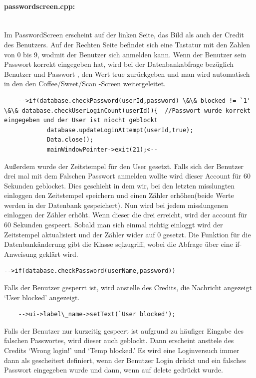 \documentclass[11pt,a4paper]{article} %
\begin{document}
\paragraph{passwordscreen.cpp:} $\;$ \\
	Im PasswordScreen erscheint auf der linken Seite, das Bild als auch der Credit des Benutzers. Auf der Rechten Seite befindet sich eine Tastatur mit den Zahlen von 0 bis 9, wodmit der Benutzer sich anmelden kann.
	Wenn der Benutzer sein Passwort korrekt eingegeben hat, wird bei der Datenbankabfrage bezüglich Benutzer und Passwort , den Wert true zurückgeben und man wird automatisch in den den Coffee/Sweet/Scan -Screen weitergeleitet.
	\begin{frame}

\begin{lstlisting}
	-->if(database.checkPassword(userId,password) \&\& blocked != `1' \&\& database.checkUserLoginCount(userId)){  //Passwort wurde korrekt eingegeben und der User ist niocht geblockt
            database.updateLoginAttempt(userId,true);
            Data.close();
            mainWindowPointer->exit(21);<--
            \end{lstlisting}
\end{frame}
\par			
	Außerdem wurde der Zeitstempel für den User gesetzt. 
	Falls sich der Benutzer drei mal mit dem Falschen Passwort anmelden wollte wird dieser Account für 60 Sekunden geblocket.
	Dies geschieht in dem wir, bei den letzten misslungten einloggen den Zeitstempel speichern und einen Zähler erhöhen(beide Werte werden in der Datenbank gespeichert).
	Nun wird bei jedem misslungenen einloggen der Zähler erhöht. Wenn dieser die drei erreicht, wird der account für 60 Sekunden gespeert.
	Sobald man sich einmal richtig einloggt wird der Zeitstempel aktualisiert und der Zähler wider auf 0 gesetzt. Die Funktion für die Datenbankänderung gibt die Klasse sqlzugriff, wobei die Abfrage über eine if-Anweisung geklärt wird.
	
	\begin{frame}

\begin{lstlisting}
-->if(database.checkPassword(userName,password))
\end{lstlisting}
\end{frame}
\par	
	Falls der Benutzer gesperrt ist, wird anstelle des Credits, die Nachricht angezeigt `User blocked' angezeigt.
	
	\begin{frame}

\begin{lstlisting}
	-->ui->label\_name->setText(`User blocked');
	\end{lstlisting}
\end{frame}
	Falls der Benutzer nur kurzeitig gespeert ist aufgrund zu häufiger Eingabe des falschen Passwortes, wird dieser auch geblockt.
	Dann erscheint ansttele des Credits `Wrong login!' und `Temp blocked.'
	Es wird eine Loginversuch immer dann als gescheitert definiert, wenn der Benutzer Login drückt und ein falsches Passwort eingegeben wurde und dann, wenn auf delete gedrückt wurde.
\par	
\end{document}
